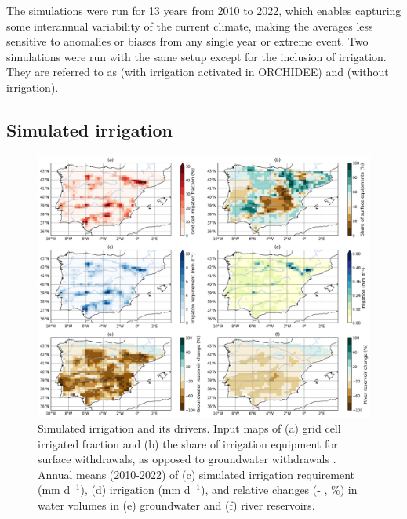The simulations were run for 13 years from 2010 to 2022, which enables capturing some interannual variability of the current climate, making the averages less sensitive to anomalies or biases from any single year or extreme event.
Two simulations were run with the same setup except for the inclusion of irrigation. 
They are referred to as \irr (with irrigation activated in ORCHIDEE) and \noirr (without irrigation). 

\subsection{Simulated irrigation}

\begin{figure}[htbp]
    \centering
    \includegraphics[width=\textwidth]{images/chap4/article/f03.png}
    \caption{Simulated irrigation and its drivers. Input maps of (a) grid cell irrigated fraction \citep[\% , derived from][]{hurtt_harmonization_2020} and (b) the share of irrigation equipment for surface withdrawals, as opposed to groundwater withdrawals \citep[\%, derived from ][]{siebert_groundwater_2010}. Annual means (2010-2022) of (c) simulated irrigation requirement (mm d$^{-1}$), (d) irrigation (mm d$^{-1}$), and relative changes (\irr - \noirr, \%) in water volumes in (e) groundwater and (f) river reservoirs.}
    \label{fig:irrig_maps}
\end{figure}

